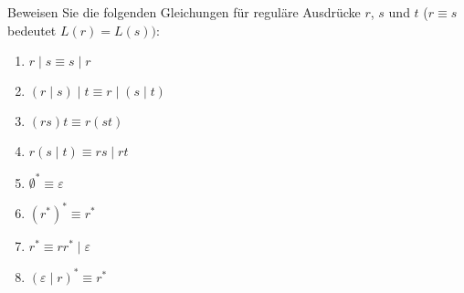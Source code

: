 \begin{exercise}

Beweisen Sie die folgenden Gleichungen für reguläre Ausdrücke $r$,
$s$ und $t$ ($r\equiv s$ bedeutet $L(r)=L(s))$:
\begin{enumerate}
  \item $r\mid s\equiv s\mid r$
  \item $(r\mid s)\mid t\equiv r\mid (s\mid t)$
  \item $(rs)t\equiv r(st)$
  \item $r(s\mid t)\equiv rs\mid rt$
  \item $\emptyset^*\equiv \varepsilon$
  \item $(r^*)^*\equiv r^*$
  \item $r^*\equiv rr^*\mid \varepsilon$
  \item $(\varepsilon \mid r)^*\equiv r^*$
\end{enumerate}

\end{exercise}

